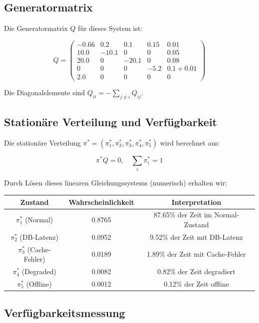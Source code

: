 \documentclass[a4paper,11pt]{article}
\theoremstyle{definition}
\begin{document}
\subsection{Generatormatrix}

Die Generatormatrix $Q$ für dieses System ist:

\[
Q = \begin{pmatrix}
-0.66 & 0.2 & 0.1 & 0.15 & 0.01 \\
10.0 & -10.1 & 0 & 0 & 0.05 \\
20.0 & 0 & -20.1 & 0 & 0.08 \\
0 & 0 & 0 & -5.2 & 0.1 + 0.01 \\
2.0 & 0 & 0 & 0 & 0
\end{pmatrix}
\]

Die Diagonalelemente sind $Q_{ii} = -\sum_{j \neq i} Q_{ij}$.

\subsection{Stationäre Verteilung und Verfügbarkeit}

Die stationäre Verteilung $\pi^* = (\pi_1^*, \pi_2^*, \pi_3^*, \pi_4^*, \pi_5^*)$ wird berechnet aus:

\[
\pi^* Q = 0, \quad \sum_i \pi_i^* = 1
\]

Durch Lösen dieses linearen Gleichungssystems (numerisch) erhalten wir:

\begin{table}[H]
    \centering
    \begin{tabular}{|c|c|c|}
        \hline
        Zustand & Wahrscheinlichkeit & Interpretation \\
        \hline
        $\pi_1^*$ (Normal) & 0.8765 & 87.65\% der Zeit im Normal-Zustand \\
        $\pi_2^*$ (DB-Latenz) & 0.0952 & 9.52\% der Zeit mit DB-Latenz \\
        $\pi_3^*$ (Cache-Fehler) & 0.0189 & 1.89\% der Zeit mit Cache-Fehler \\
        $\pi_4^*$ (Degraded) & 0.0082 & 0.82\% der Zeit degradiert \\
        $\pi_5^*$ (Offline) & 0.0012 & 0.12\% der Zeit offline \\
        \hline
    \end{tabular}
\end{table}

\subsection{Verfügbarkeitsmessung}
\end{document}
